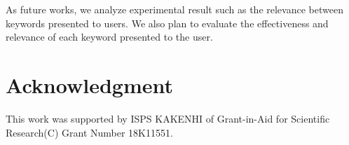 \documentclass[journal]{IAENGtran}
\begin{document}
As future works, we analyze experimental result such as the relevance between keywords presented to users.
We also plan to evaluate the effectiveness and relevance of each keyword presented to the user.


\section*{Acknowledgment}
This work was supported by ISPS KAKENHI of Grant-in-Aid for Scientific Research(C) Grant Number 18K11551.

\ifCLASSOPTIONcaptionsoff
  \newpage
\fi
\end{document}
